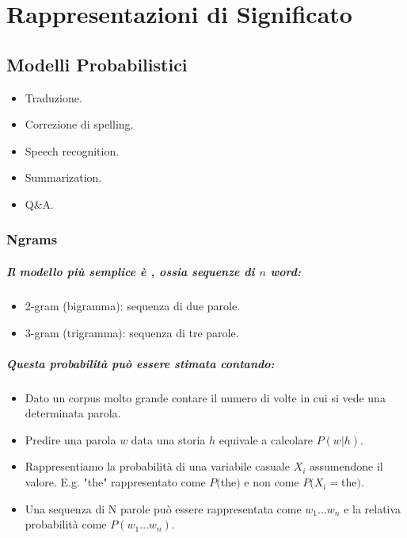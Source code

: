 \chapter{Rappresentazioni di Significato}

\section{Modelli Probabilistici}


\begin{itemize}
  \item Traduzione. 
  \item Correzione di spelling. 
  \item Speech recognition. 
  \item Summarization. 
  \item Q\&A.
\end{itemize}


\subsection{Ngrams}

\paragraph{Il modello più semplice è , ossia sequenze di $n$ word:}

\begin{itemize}
  \item 2-gram (bigramma): sequenza di due parole. 
  \item 3-gram (trigramma): sequenza di tre parole.
\end{itemize}


\paragraph{Questa probabilità può essere stimata contando:}

\begin{itemize}
  \item Dato un corpus molto grande contare il numero di volte in cui si vede una determinata parola. 
  \item Predire una parola $w$ data una storia $h$ equivale a calcolare $P(w|h)$. 
  \item Rappresentiamo la probabilità di una variabile casuale $X_i$ assumendone il valore. E.g. "the" rappresentato come $P($the$)$ e non come $P(X_i = $the$)$.
  \item Una sequenza di N parole può essere rappresentata come $w_1\dots w_n$ e la relativa probabilità come $P(w_1\dots w_n)$.
\end{itemize}

